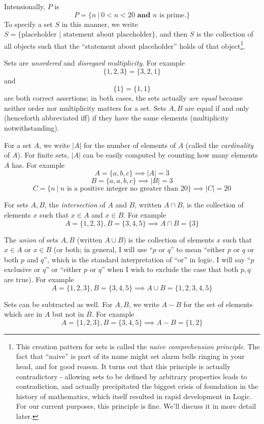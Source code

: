 Intensionally, $P$ is
\[
  P = \{n\ |\ 0 < n < 20 \textbf{ and } n \text{ is prime.}\}
\]
To specify a set $S$ in this manner, we write $S = \{\text{placeholder }| \text{ statement about placeholder}\}$, and then $S$ is the collection of all objects such that the ``statement about placeholder'' holds of that object\footnote{This creation pattern for sets is called the \emph{naive comprehension principle}. The fact that ``naive'' is part of its name might set alarm bells ringing in your head, and for good reason. It turns out that this principle is actually contradictory - allowing sets to be defined by arbitrary properties leads to contradiction, and actually precipitated the biggest crisis of foundation in the history of mathematics, which itself resulted in rapid development in Logic. For our current purposes, this principle is fine. We'll discuss it in more detail later.}. 

Sets are \emph{unordered} and \emph{disregard multiplicity}. For example
\[
  \{1, 2, 3\} = \{3, 2, 1\}
\]
and
\[
  \{1\} = \{1, 1\}
\]
are both correct assertions; in both cases, the sets actually \emph{are equal} because neither order nor multiplicity matters for a set. Sets $A, B$ are equal if and only (henceforth abbreviated iff) if they have the same elements (multiplicity notwithstanding). 

For a set $A$, we write $|A|$ for the number of elements of $A$ (called the \emph{cardinality} of $A$). For finite sets, $|A|$ can be easily computed by counting how many elements $A$ has. For example
\[
  A = \{a, b, c\} \implies |A| = 3
\]
\[
  B = \{a, a, b, c\} \implies |B| = 3
\]
\[
  C = \{n\ |\ n \text{ is a positive integer no greater than }20\} \implies |C| = 20
\]

For sets $A, B$, the \emph{intersection} of $A$ and $B$, written $A \cap B$, is the collection of elements $x$ such that $x \in A$ and $x \in B$. For example
\[
  A = \{1, 2, 3\}, B = \{3, 4, 5\} \implies A \cap B = \{3\}
\]

The \emph{union} of sets $A, B$ (written $A \cup B$) is the collection of elements $x$ such that $x\in A$ or $x \in B$ (or both; in general, I will use ``$p$ or $q$'' to mean ``either $p$ or $q$ or both $p$ and $q$'', which is the standard interpretation of ``or'' in logic. I will say ``$p$ exclusive or $q$'' or ``either $p$ or $q$'' when I wish to exclude the case that both $p, q$ are true). For example
\[
  A = \{1, 2, 3\}, B = \{3, 4, 5\} \implies A \cup B = \{1, 2,3 , 4, 5\}
\]

Sets can be subtracted as well. For $A, B$, we write $A - B$ for the set of elements which are in $A$ but not in $B$. For example
\[
  A = \{1, 2, 3\}, B = \{3, 4, 5\} \implies A - B = \{1, 2\}
\]

